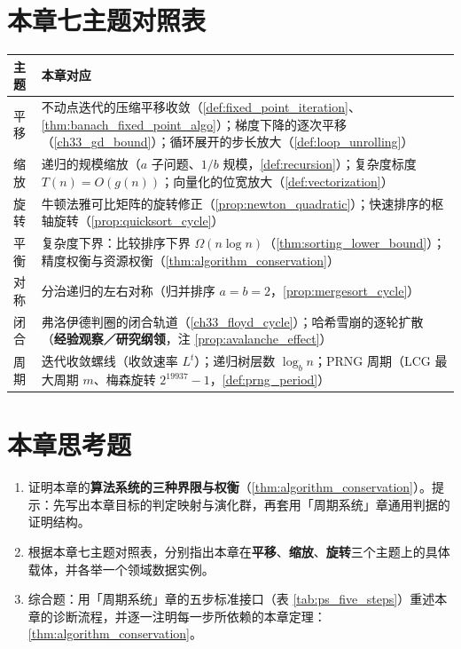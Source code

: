 \section*{本章七主题对照表}

\begin{center}
\begin{tabular}{>{\centering\arraybackslash}p{2.2cm}>{\centering\arraybackslash}p{10.5cm}}
\toprule
主题 & 本章对应 \\
\midrule
平移 & 不动点迭代的压缩平移收敛（\cref{def:fixed_point_iteration}、\cref{thm:banach_fixed_point_algo}）；梯度下降的逐次平移（\cref{ch33_gd_bound}）；循环展开的步长放大（\cref{def:loop_unrolling}） \\
缩放 & 递归的规模缩放（$a$ 子问题、$1/b$ 规模，\cref{def:recursion}）；复杂度标度 $T(n)=O(g(n))$；向量化的位宽放大（\cref{def:vectorization}） \\
旋转 & 牛顿法雅可比矩阵的旋转修正（\cref{prop:newton_quadratic}）；快速排序的枢轴旋转（\cref{prop:quicksort_cycle}） \\
平衡 & 复杂度下界：比较排序下界 $\Omega(n\log n)$（\cref{thm:sorting_lower_bound}）；精度权衡与资源权衡（\cref{thm:algorithm_conservation}） \\
对称 & 分治递归的左右对称（归并排序 $a=b=2$，\cref{prop:mergesort_cycle}） \\
闭合 & 弗洛伊德判圈的闭合轨道（\cref{ch33_floyd_cycle}）；哈希雪崩的逐轮扩散（\textbf{经验观察／研究纲领}，注 \cref{prop:avalanche_effect}） \\
周期 & 迭代收敛螺线（收敛速率 $L^t$）；递归树层数 $\log_b n$；PRNG 周期（LCG 最大周期 $m$、梅森旋转 $2^{19937}-1$，\cref{def:prng_period}） \\
\bottomrule
\end{tabular}
\end{center}

\section*{本章思考题}

\begin{enumerate}[leftmargin=3em, label=\textbf{题 \arabic*}]
    \item 证明本章的\textbf{算法系统的三种界限与权衡}（\ref{thm:algorithm_conservation}）。提示：先写出本章目标的判定映射与演化群，再套用「周期系统」章通用判据的证明结构。

    \item 根据本章七主题对照表，分别指出本章在\textbf{平移}、\textbf{缩放}、\textbf{旋转}三个主题上的具体载体，并各举一个领域数据实例。

    \item 综合题：用「周期系统」章的五步标准接口（表 \ref{tab:ps_five_steps}）重述本章的诊断流程，并逐一注明每一步所依赖的本章定理：\ref{thm:algorithm_conservation}。
\end{enumerate}


